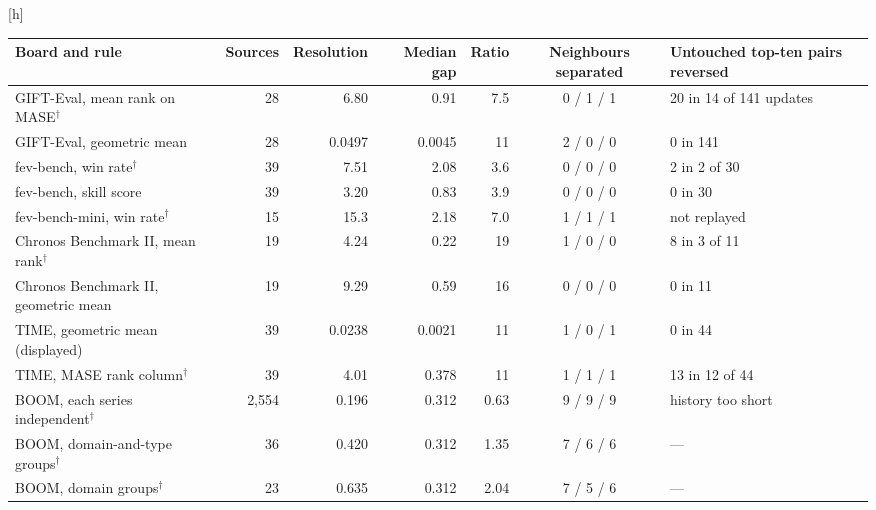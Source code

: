 \documentclass{article}
\makeatletter
\renewenvironment{table}
  {\setlength{\abovecaptionskip}{6\p@}%
   \setlength{\belowcaptionskip}{\z@}%
   \@float{table}}
  {\end@float}
\makeatother
\begin{document}
\begin{table}[h]
\centering
\scriptsize
\setlength{\tabcolsep}{3pt}
\begin{tabular}{@{}p{3.6cm}rrrrcp{2.9cm}@{}}
\toprule
\textbf{Board and rule} & \textbf{Sources} & \textbf{Resolution} & \textbf{Median gap} &
\textbf{Ratio} & \textbf{Neighbours separated} & \textbf{Untouched top-ten pairs reversed} \\
\midrule
GIFT-Eval, mean rank on MASE$^\dagger$ & 28 & 6.80 & 0.91 & 7.5 & 0 / 1 / 1 & 20 in 14 of 141 updates \\
GIFT-Eval, geometric mean & 28 & 0.0497 & 0.0045 & 11 & 2 / 0 / 0 & 0 in 141 \\
fev-bench, win rate$^\dagger$ & 39 & 7.51 & 2.08 & 3.6 & 0 / 0 / 0 & 2 in 2 of 30 \\
fev-bench, skill score & 39 & 3.20 & 0.83 & 3.9 & 0 / 0 / 0 & 0 in 30 \\
fev-bench-mini, win rate$^\dagger$ & 15 & 15.3 & 2.18 & 7.0 & 1 / 1 / 1 & not replayed \\
Chronos Benchmark II, mean rank$^\dagger$ & 19 & 4.24 & 0.22 & 19 & 1 / 0 / 0 & 8 in 3 of 11 \\
Chronos Benchmark II, geometric mean & 19 & 9.29 & 0.59 & 16 & 0 / 0 / 0 & 0 in 11 \\
TIME, geometric mean (displayed) & 39 & 0.0238 & 0.0021 & 11 & 1 / 0 / 1 & 0 in 44 \\
TIME, MASE rank column$^\dagger$ & 39 & 4.01 & 0.378 & 11 & 1 / 1 / 1 & 13 in 12 of 44 \\
BOOM, each series independent$^\dagger$ & 2,554 & 0.196 & 0.312 & 0.63 & 9 / 9 / 9 & history too short \\
BOOM, domain-and-type groups$^\dagger$ & 36 & 0.420 & 0.312 & 1.35 & 7 / 6 / 6 & --- \\
BOOM, domain groups$^\dagger$ & 23 & 0.635 & 0.312 & 2.04 & 7 / 5 / 6 & --- \\
\bottomrule
\end{tabular}
\caption{The report on every board. Resolution is under CR2, and the ratio is the resolution
divided by the median gap between displayed neighbours. Neighbours separated are out of 9,
uncorrected, under the submitted version's rule, CR2 and the wild cluster bootstrap. A dagger
marks rules that rank an entry against the other entries. Resolution and gap are in rank places
for mean ranks, win-rate points for win rate and rank points for BOOM. For the geometric means
of GIFT-Eval and TIME they are log ratios, and for fev-bench's skill score and Chronos Benchmark
II's geometric mean log ratios times 100. Pins: GIFT-Eval 2026-09-07, TIME 2026-10-31, the
other boards 2026-11-11. GIFT-Eval's 20 reversals use the board's exact tie-break, and with
tied ranks averaged the count is 18. TIME's counts come from the full replay of its 44
updates.}
\label{tab:boards}
\end{table}
\end{document}
